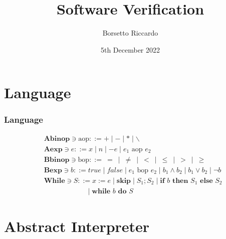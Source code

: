 \documentclass{beamer}
\title{Software Verification}
\author{Borsetto Riccardo}
\institute{Univerisità degli Studi di Padova}
\date{5th December 2022}
\begin{document}
\frame{\titlepage}


\section{Language}

\begin{frame}
    \frametitle{Language}
        \begin{align*}
        &\mathbf { Abinop } \ni \text{aop}::= + \mid - \mid * \mid \backslash  \\
        &\mathbf { Aexp } \ni e::= x \mid n \mid -e \mid e_1 \text { aop } e_2 \\
        &\mathbf { Bbinop } \ni \text{bop}::= \ =\ \mid\ \ne\ \mid\ <\ \mid\ \le\ \mid\ > \ \mid\ \ge\\
        & \mathbf { Bexp } \ni b::=  true  \mid false \mid e_1 \text{ bop } e_2 \mid b_1 \wedge b_2 \mid b_1 \vee b_2 \mid \neg b \\
        & \mathbf { While } \ni S::= x:=e \mid \textbf {skip} \mid S_1 ; S_2 \mid \textbf {if } b \textbf { then } S_1 \textbf { else } S_2\\
         &\qquad \qquad \qquad \mid \textbf {while } b \textbf { do } S
        \end{align*}
\end{frame}

\section{Abstract Interpreter}
\end{document}
